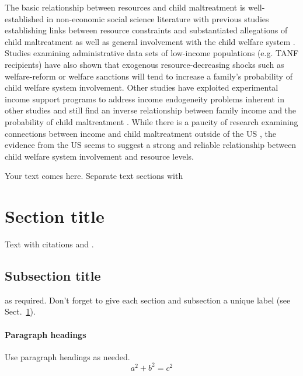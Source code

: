 The basic relationship between resources and child maltreatment is well-established in non-economic social science literature with previous studies establishing links between resource constraints and substantiated allegations of child maltreatment as well as general involvement with the child welfare system \citep{Gil1970, Pelton1981, Pelton1994, Russell1984, Sedlak1996, Stith2009, BergerAndWoldfogel2004}. Studies examining administrative data sets of low-income populations (e.g. TANF recipients) have also shown that exogenous resource-decreasing shocks such as welfare-reform \citep{Courtney2005} or welfare sanctions \citep{Slack2007} will tend to increase a family's probability of child welfare system involvement. Other studies have exploited experimental income support programs to address income endogeneity problems inherent in other studies and still find an inverse relationship between family income and the probability of child maltreatment \citep{Cancian2013, Fein2003}. While there is a paucity of research examining connections between income and child maltreatment outside of the US \citep{Cameron2006}, the evidence from the US seems to suggest a strong and reliable relationship between child welfare system involvement and resource levels. 

Your text comes here. Separate text sections with
\section{Section title}
\label{sec:1}
Text with citations \cite{RefB} and \cite{RefJ}.
\subsection{Subsection title}
\label{sec:2}
as required. Don't forget to give each section
and subsection a unique label (see Sect.~\ref{sec:1}).
\paragraph{Paragraph headings} Use paragraph headings as needed.
\begin{equation}
a^2+b^2=c^2
\end{equation}


